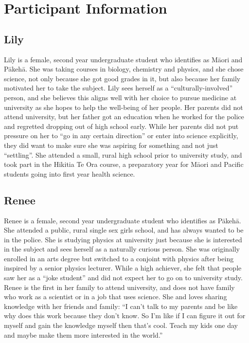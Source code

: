 \chapter*{Participant Information}

\section{Lily}
Lily is a female, second year undergraduate student who identifies as M\={a}ori and P\={a}keh\={a}. She was taking courses in biology, chemistry and physics, and she chose science, not only because she got good grades in it, but also because her family motivated her to take the subject. Lily sees herself as a ``culturally-involved'' person, and she believes this aligns well with her choice to pursue medicine at university as she hopes to help the well-being of her people. Her parents did not attend university, but her father got an education when he worked for the police and regretted dropping out of high school early. While her parents did not put pressure on her to ``go in any certain direction'' or enter into science explicitly, they did want to make sure she was aspiring for something and not just ``settling''. She attended a small, rural high school prior to university study, and took part in the Hikitia Te Ora course, a preparatory year for M\={a}ori and Pacific students going into first year health science. 

\section{Renee}
Renee is a female, second year undergraduate student who identifies as P\={a}keh\={a}. She attended a public, rural single sex girls school, and has always wanted to be in the police. She is studying physics at university just because she is interested in the subject and sees herself as a naturally curious person. She was originally enrolled in an arts degree but switched to a conjoint with physics after being inspired by a senior physics lecturer. While a high achiever, she felt that people saw her as a ``joke student'' and did not expect her to go on to university study. Renee is the first in her family to attend university, and does not have family who work as a scientist or in a job that uses science. She  and loves sharing knowledge with her friends and family: ``I can't talk to my parents and be like why does this work because they don't know. So I'm like if I can figure it out for myself and gain the knowledge myself then that's cool. Teach my kids one day and maybe make them more interested in the world.''

